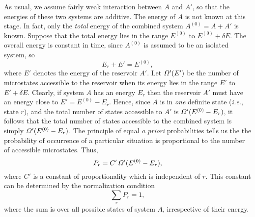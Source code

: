 As usual, we assume fairly weak interaction between $A$ and $A'$, so that
the energies of these two systems
 are additive. The energy of $A$ is not known at this
stage. In fact, only the  {\em total}\/ energy of the combined system $A^{(0)} = 
A + A'$ is known. Suppose that the
total energy lies in the range $E^{(0)}$ to $E^{(0)} + \delta E$. 
The overall energy is constant in time, since $A^{(0)}$
is assumed to be an isolated system, so
\begin{equation}
E_r + E' = E^{(0)},
\end{equation}
where $E'$ denotes the energy of the reservoir $A'$. Let ${\mit\Omega}'(E')$ be the
number of microstates accessible to the reservoir when its energy lies in the
range $E'$ to $E' + \delta E$. Clearly, if system $A$ has an energy $E_r$ then
the reservoir $A'$ must have an energy close to $E'=E^{(0)} - E_r$. Hence,
since $A$ is in {\em one}\/ definite state ({\em i.e.}, state $r$), and the total
number of states accessible to $A'$ is ${\mit\Omega}'(E^{(0)} - E_r)$, it
follows that
the total number
of states accessible to the combined system is simply ${\mit\Omega}'(E^{(0)} - E_r)$.
The principle of equal {\em a priori}\/ probabilities tells us the the probability
of occurrence of a particular situation is proportional to the number
of accessible microstates. Thus,
\begin{equation}
P_r = C' \,{\mit\Omega}'(E^{(0)} - E_r),
\end{equation}
where $C'$ is a constant of proportionality which is independent of $r$.
This constant can be determined by the normalization condition
\begin{equation}
\sum_r P_r = 1,
\end{equation}
where the sum is over all possible states of system $A$, irrespective of their energy.

